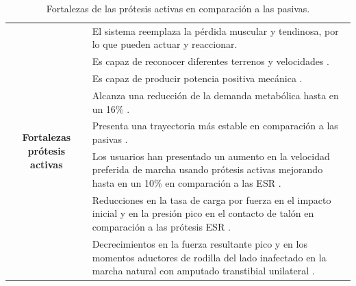 \documentclass[12pt,english]{article}
\providecommand{\tabularnewline}{\\}
\begin{document}
\begin{center}
\begin{table}[H]
\caption{\label{tab:Fortalezas-de-las-activas}Fortalezas de las prótesis activas
en comparación a las pasivas.}


\begin{tabular}{|c|>{\centering}p{15cm}|}
\hline 
\multirow{8}{*}[-6mm]{\begin{turn}{90}
\textbf{Fortalezas prótesis activas}
\end{turn}} & El sistema reemplaza la pérdida muscular y tendinosa, por lo que pueden
actuar y reaccionar\cite{Varol2010}. \tabularnewline
\cline{2-2} 
 & Es capaz de reconocer diferentes terrenos y velocidades \cite{Lawson2011}. \tabularnewline
\cline{2-2} 
 & Es capaz de producir potencia positiva mecánica \cite{Martinez-Villalpando2009}.\tabularnewline
\cline{2-2} 
 & Alcanza una reducción de la demanda metabólica hasta en un 16\% \cite{Herr2010,Esposito2015}.\tabularnewline
\cline{2-2} 
 & Presenta una trayectoria más estable en comparación a las pasivas \cite{Hill2013a}.\tabularnewline
\cline{2-2} 
 & Los usuarios han presentado un aumento en la velocidad preferida de
marcha usando prótesis activas mejorando hasta en un 10\% en comparación
a las ESR \cite{Gates2013}.\tabularnewline
\cline{2-2} 
 & Reducciones en la tasa de carga por fuerza en el impacto inicial y
en la presión pico en el contacto de talón en comparación a las prótesis
ESR \cite{Hill2013a}.\tabularnewline
\cline{2-2} 
 & Decrecimientos en la fuerza resultante pico y en los momentos aductores
de rodilla del lado inafectado en la marcha natural con amputado transtibial
unilateral \cite{Grabowski2013}.\tabularnewline
\hline 
\end{tabular}
\end{table}

\par\end{center}
\end{document}
